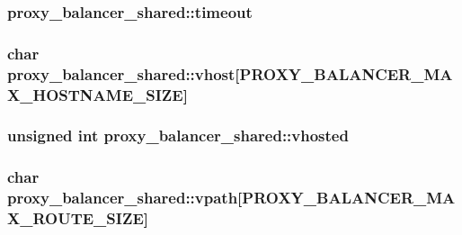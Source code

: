 \subsubsection[{\texorpdfstring{timeout}{timeout}}]{ proxy\+\_\+balancer\+\_\+shared\+::timeout}\hypertarget{structproxy__balancer__shared_ad3e863ad3018db7d5a44297e4da52928}{}\label{structproxy__balancer__shared_ad3e863ad3018db7d5a44297e4da52928}
\subsubsection[{\texorpdfstring{vhost}{vhost}}]{\setlength{\rightskip}{0pt plus 5cm}char proxy\+\_\+balancer\+\_\+shared\+::vhost\mbox{[}{\bf P\+R\+O\+X\+Y\+\_\+\+B\+A\+L\+A\+N\+C\+E\+R\+\_\+\+M\+A\+X\+\_\+\+H\+O\+S\+T\+N\+A\+M\+E\+\_\+\+S\+I\+ZE}\mbox{]}}\hypertarget{structproxy__balancer__shared_a73faf9f0ffe756037906c3e10a5ca027}{}\label{structproxy__balancer__shared_a73faf9f0ffe756037906c3e10a5ca027}
\subsubsection[{\texorpdfstring{vhosted}{vhosted}}]{\setlength{\rightskip}{0pt plus 5cm}unsigned {\bf int} proxy\+\_\+balancer\+\_\+shared\+::vhosted}\hypertarget{structproxy__balancer__shared_a813239b3232b7f9e9c62cc89a594d5cd}{}\label{structproxy__balancer__shared_a813239b3232b7f9e9c62cc89a594d5cd}
\subsubsection[{\texorpdfstring{vpath}{vpath}}]{\setlength{\rightskip}{0pt plus 5cm}char proxy\+\_\+balancer\+\_\+shared\+::vpath\mbox{[}{\bf P\+R\+O\+X\+Y\+\_\+\+B\+A\+L\+A\+N\+C\+E\+R\+\_\+\+M\+A\+X\+\_\+\+R\+O\+U\+T\+E\+\_\+\+S\+I\+ZE}\mbox{]}}\hypertarget{structproxy__balancer__shared_a7b129997c3d8ae9c884736843fa7dadd}{}\label{structproxy__balancer__shared_a7b129997c3d8ae9c884736843fa7dadd}

